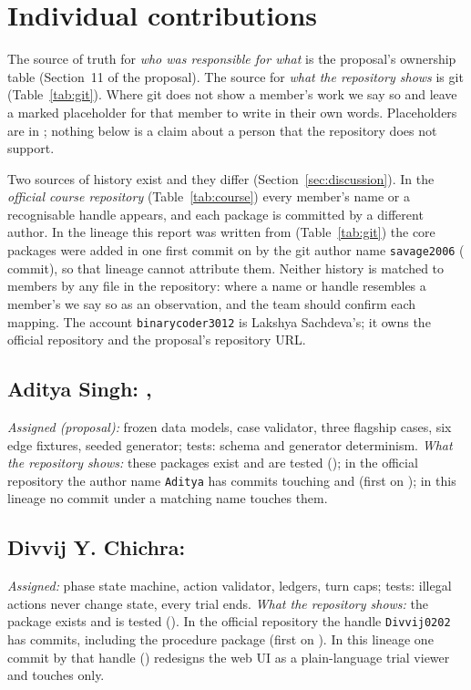 \section{Individual contributions}\label{sec:contrib}
The source of truth for \emph{who was responsible for what} is the proposal's ownership table (Section~11 of the proposal). The source for \emph{what the repository shows} is git (Table~\ref{tab:git}). Where git does not show a member's work we say so and leave a marked placeholder for that member to write in their own words. Placeholders are in ; nothing below is a claim about a person that the repository does not support.

Two sources of history exist and they differ (Section~\ref{sec:discussion}). In the \emph{official course repository} (Table~\ref{tab:course}) every member's name or a recognisable handle appears, and each package is committed by a different author. In the lineage this report was written from (Table~\ref{tab:git}) the core packages were added in one first commit on \LumpDate{} by the git author name \texttt{savage2006} (\CommitsSavage{} commit), so that lineage cannot attribute them. Neither history is matched to members by any file in the repository: where a name or handle resembles a member's we say so as an observation, and the team should confirm each mapping. The account \texttt{binarycoder3012} is Lakshya Sachdeva's; it owns the official repository and the proposal's repository URL.

\subsection*{Aditya Singh: , }
\emph{Assigned (proposal):} frozen data models, case validator, three flagship cases, six edge fixtures, seeded generator; tests: schema and generator determinism. \emph{What the repository shows:} these packages exist and are tested (); in the official repository the author name \texttt{Aditya} has \CourseAditya{} commits touching  and  (first on \CourseFirstContracts{}); in this lineage no commit under a matching name touches them. 

\subsection*{Divvij Y. Chichra: }
\emph{Assigned:} phase state machine, action validator, ledgers, turn caps; tests: illegal actions never change state, every trial ends. \emph{What the repository shows:} the package exists and is tested (). In the official repository the handle \texttt{Divvij0202} has \CourseDivvij{} commits, including the procedure package (first on \CourseFirstProcedure{}). In this lineage one commit by that handle (\FirstDivvij) redesigns the web UI as a plain-language trial viewer and touches  only. 

